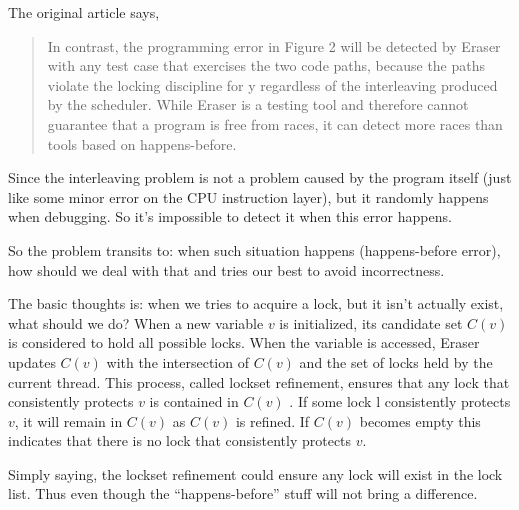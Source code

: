 \documentclass[
]{article}
\begin{document}
The original article says,

\begin{quote}
In contrast, the programming error in Figure 2 will be detected by Eraser with any test case that exercises the two code paths, because the paths violate the locking discipline for y regardless of the interleaving produced by the scheduler. While Eraser is a testing tool and therefore cannot guarantee that a program is free from races, it can detect more races than tools based on happens-before.
\end{quote}

Since the interleaving problem is not a problem caused by the program itself (just like some minor error on the CPU instruction layer), but it randomly happens when debugging. So it's impossible to detect it when this error happens.

So the problem transits to: when such situation happens (happens-before error), how should we deal with that and tries our best to avoid incorrectness.

The basic thoughts is: when we tries to acquire a lock, but it isn't actually exist, what should we do? When a new variable $v$ is initialized, its candidate set $C(v)$ is considered to hold all possible locks. When the variable is accessed, Eraser updates $C(v)$ with the intersection of $C(v)$ and the set of locks held by the current thread. This process, called lockset refinement, ensures that any lock that consistently protects $v$ is contained in $C(v)$ . If some lock l consistently protects $v$, it will remain in $C(v)$ as $C(v)$ is refined. If $C(v)$ becomes empty this indicates that there is no lock that consistently protects $v$.

Simply saying, the lockset refinement could ensure any lock will exist in the lock list. Thus even though the ``happens-before'' stuff will not bring a difference.
\end{document}
